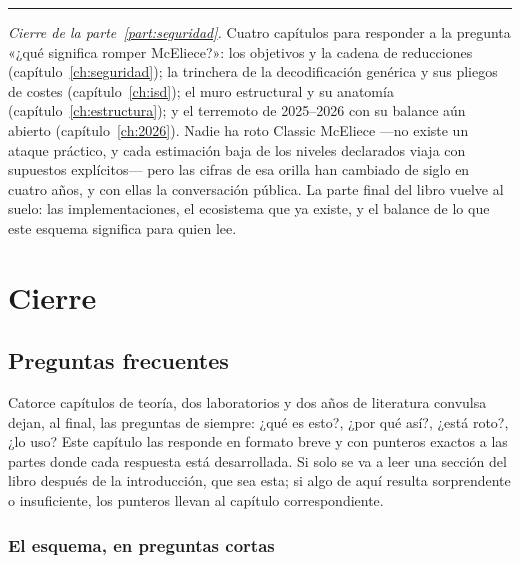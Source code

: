 \documentclass[11pt,a4paper,oneside]{report}
\begin{document}
\begin{center}\rule{0.55\textwidth}{0.4pt}\end{center}
\medskip
\noindent\textit{Cierre de la parte~\ref{part:seguridad}.} Cuatro
capítulos para responder a la pregunta «¿qué significa romper
McEliece?»: los objetivos y la cadena de reducciones
(capítulo~\ref{ch:seguridad}); la trinchera de la decodificación
genérica y sus pliegos de costes (capítulo~\ref{ch:isd}); el muro
estructural y su anatomía (capítulo~\ref{ch:estructura}); y el
terremoto de 2025--2026 con su balance aún abierto
(capítulo~\ref{ch:2026}). Nadie ha roto Classic McEliece ---no
existe un ataque práctico, y cada estimación baja de los niveles
declarados viaja con supuestos explícitos--- pero las cifras de esa
orilla han cambiado de siglo en cuatro años, y con ellas la
conversación pública. La parte final del libro vuelve al suelo: las
implementaciones, el ecosistema que ya existe, y el balance de lo
que este esquema significa para quien lee.



\part{Cierre}\label{part:cierre}

\chapter{Preguntas frecuentes}\label{ch:faq}

\begin{roadmap}
Catorce capítulos de teoría, dos laboratorios y dos años de
literatura convulsa dejan, al final, las preguntas de siempre: ¿qué
es esto?, ¿por qué así?, ¿está roto?, ¿lo uso? Este capítulo las
responde en formato breve y con punteros exactos a las partes donde
cada respuesta está desarrollada. Si solo se va a leer una sección
del libro después de la introducción, que sea esta; si algo de aquí
resulta sorprendente o insuficiente, los punteros llevan al capítulo
correspondiente.
\end{roadmap}

\section{El esquema, en preguntas cortas}
\end{document}
